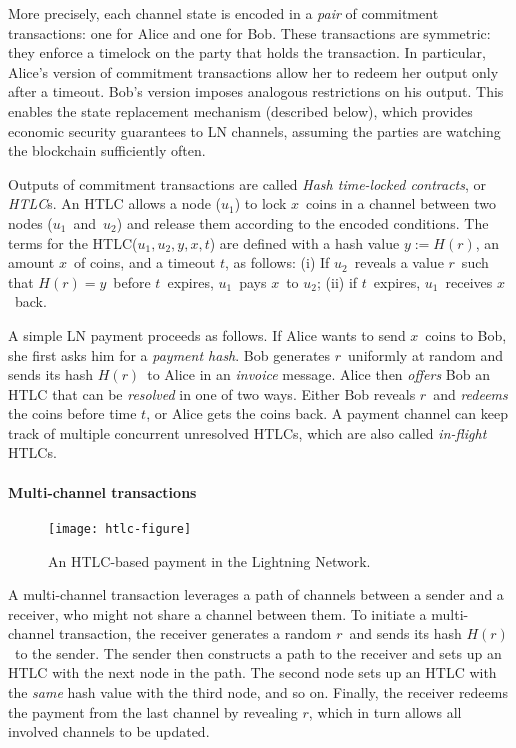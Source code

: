 More precisely, each channel state is encoded in a \textit{pair} of commitment transactions: one for Alice and one for Bob.
These transactions are symmetric: they enforce a timelock on the party that holds the transaction.
In particular, Alice's version of commitment transactions allow her to redeem her output only after a timeout.
Bob's version imposes analogous restrictions on his output.
This enables the state replacement mechanism (described below), which provides economic security guarantees to LN channels, assuming the parties are watching the blockchain sufficiently often.

Outputs of commitment transactions are called \textit{Hash time-locked contracts}, or \textit{HTLC}s.
An HTLC allows a node ($u_1$) to lock $x$~coins in a channel between two nodes ($u_1$~and~$u_2$) and release them according to the encoded conditions.
The terms for the HTLC($u_1, u_2, y, x, t$) are defined with a hash value $y := H(r)$, an amount $x$~of coins, and a timeout $t$, as follows: 
(i) If $u_2$~reveals a value $r$~such that $H(r) = y$~before $t$~expires, $u_1$~pays $x$~to $u_2$; 
(ii) if $t$~expires, $u_1$~receives $x$~back.

A simple LN payment proceeds as follows.
If Alice wants to send $x$~coins to Bob, she first asks him for a \textit{payment hash}.
Bob generates $r$~uniformly at random and sends its hash $H(r)$~to Alice in an \textit{invoice} message.
Alice then \textit{offers} Bob an HTLC that can be \textit{resolved} in one of two ways.
Either Bob reveals $r$~and \textit{redeems} the coins before time $t$, or Alice gets the coins back.
A payment channel can keep track of multiple concurrent unresolved HTLCs, which are also called \textit{in-flight} HTLCs.


\paragraph{Multi-channel transactions}

\begin{figure*}[h]
	\texttt{[image: htlc-figure]}
	\caption{An HTLC-based payment in the Lightning Network.}
	\label{fig:htlc}
\end{figure*}

A multi-channel transaction leverages a path of channels between a sender and a receiver, who might not share a channel between them.
To initiate a multi-channel transaction, the receiver generates a random $r$~and sends its hash $H(r)$~to the sender.
The sender then constructs a path to the receiver and sets up an HTLC with the next node in the path.
The second node sets up an HTLC with the \textit{same} hash value with the third node, and so on.
Finally, the receiver redeems the payment from the last channel by revealing $r$, which in turn allows all involved channels to be updated.

